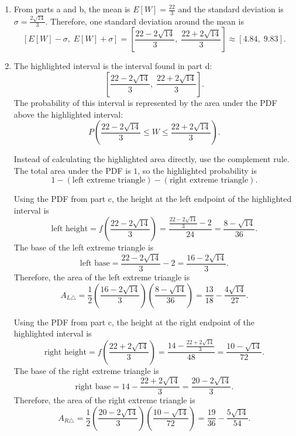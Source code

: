 \begin{enumerate}[label=\textbf{\alph*)}]
	To find \(m_2\), use the fact that the line has height \(\frac{1}{6}\) at the mode \(w=6\):
	\[
	f(6)=\frac{1}{6}
	\qquad \longrightarrow \qquad
	m_2(6-14)=\frac{1}{6}
	\qquad \longrightarrow \qquad
	-8m_2=\frac{1}{6}
	\qquad \longrightarrow \qquad
	m_2=-\frac{1}{48}.
	\]
	Therefore,
	\[
	f(w)=-\frac{1}{48}(w-14)
	=
	\frac{14-w}{48},
	\qquad 6\le w\le 14.
	\]
	
	Thus,
	\[
	f(w)=
	\begin{cases}
		\frac{w-2}{24}, & 2\le w\le 6,\\
		\frac{14-w}{48}, & 6\le w\le 14,\\
		0, & \text{otherwise}.
	\end{cases}
	\]
	
	\item From parts a and b, the mean is \(E[W]=\frac{22}{3}\) and the standard deviation is \(\sigma=\frac{2\sqrt{14}}{3}\). Therefore, one standard deviation around the mean is
	\[
	[E[W]-\sigma,\;E[W]+\sigma]
	=
	\left[\frac{22-2\sqrt{14}}{3},\;\frac{22+2\sqrt{14}}{3}\right]
	\approx [4.84,\;9.83].
	\]
	
	
		\item The highlighted interval is the interval found in part d:
	\[
	\left[\frac{22-2\sqrt{14}}{3},\;\frac{22+2\sqrt{14}}{3}\right].
	\]
	The probability of this interval is represented by the area under the PDF above the highlighted interval:
	\[
	P\left(\frac{22-2\sqrt{14}}{3}\le W\le \frac{22+2\sqrt{14}}{3}\right).
	\]
	
	Instead of calculating the highlighted area directly, use the complement rule. The total area under the PDF is \(1\), so the highlighted probability is
	\[
	1-(\text{left extreme triangle})-(\text{right extreme triangle}).
	\]
	
	Using the PDF from part c, the height at the left endpoint of the highlighted interval is
	\[
	\text{left height}
	=
	f\left(\frac{22-2\sqrt{14}}{3}\right)
	=
	\frac{\frac{22-2\sqrt{14}}{3}-2}{24}
	=
	\frac{8-\sqrt{14}}{36}.
	\]
	The base of the left extreme triangle is
	\[
	\text{left base}
	=
	\frac{22-2\sqrt{14}}{3}-2
	=
	\frac{16-2\sqrt{14}}{3}.
	\]
	Therefore, the area of the left extreme triangle is
	\[
	A_{L\triangle}
	=
	\frac{1}{2}
	\left(\frac{16-2\sqrt{14}}{3}\right)
	\left(\frac{8-\sqrt{14}}{36}\right)
	=
	\frac{13}{18}-\frac{4\sqrt{14}}{27}.
	\]
	
	Using the PDF from part c, the height at the right endpoint of the highlighted interval is
	\[
	\text{right height}
	=
	f\left(\frac{22+2\sqrt{14}}{3}\right)
	=
	\frac{14-\frac{22+2\sqrt{14}}{3}}{48}
	=
	\frac{10-\sqrt{14}}{72}.
	\]
	The base of the right extreme triangle is
	\[
	\text{right base}
	=
	14-\frac{22+2\sqrt{14}}{3}
	=
	\frac{20-2\sqrt{14}}{3}.
	\]
	Therefore, the area of the right extreme triangle is
	\[
	A_{R\triangle}
	=
	\frac{1}{2}
	\left(\frac{20-2\sqrt{14}}{3}\right)
	\left(\frac{10-\sqrt{14}}{72}\right)
	=
	\frac{19}{36}-\frac{5\sqrt{14}}{54}.
	\]
	

\end{enumerate}
